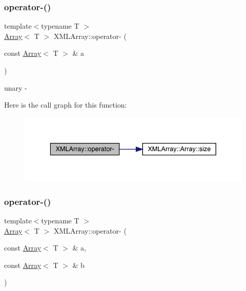 \subsubsection{\texorpdfstring{operator-\/()}{operator-()}\hspace{0.1cm}{\footnotesize\ttfamily [5/8]}}
{\footnotesize\ttfamily template$<$typename T $>$ \\
\mbox{\hyperlink{classXMLArray_1_1Array}{Array}}$<$ T $>$ X\+M\+L\+Array\+::operator-\/ (\begin{DoxyParamCaption}\item[{const \mbox{\hyperlink{classXMLArray_1_1Array}{Array}}$<$ T $>$ \&}]{a }\end{DoxyParamCaption})\hspace{0.3cm}{\ttfamily [inline]}}



unary -\/ 

Here is the call graph for this function\+:\nopagebreak
\begin{figure}[H]
\begin{center}
\leavevmode
\includegraphics[width=336pt]{dd/db1/namespaceXMLArray_a1d51bbb3ee59a78dd9e705ecd3db1571_cgraph}
\end{center}
\end{figure}
\mbox{\label{namespaceXMLArray_ae8e0bb6934e99151ecdd65abfad39763}} 
\subsubsection{\texorpdfstring{operator-\/()}{operator-()}\hspace{0.1cm}{\footnotesize\ttfamily [6/8]}}
{\footnotesize\ttfamily template$<$typename T $>$ \\
\mbox{\hyperlink{classXMLArray_1_1Array}{Array}}$<$ T $>$ X\+M\+L\+Array\+::operator-\/ (\begin{DoxyParamCaption}\item[{const \mbox{\hyperlink{classXMLArray_1_1Array}{Array}}$<$ T $>$ \&}]{a,  }\item[{const \mbox{\hyperlink{classXMLArray_1_1Array}{Array}}$<$ T $>$ \&}]{b }\end{DoxyParamCaption})\hspace{0.3cm}{\ttfamily [inline]}}



